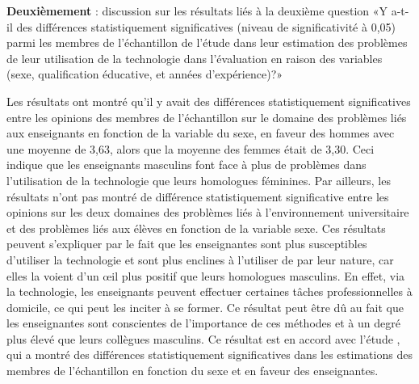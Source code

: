 \documentclass[french]{textolivre}
\begin{document}
\textbf{Deuxièmement} : discussion sur les résultats liés à la deuxième question «Y a-t-il des différences statistiquement significatives (niveau de significativité à 0,05) parmi les membres de l'échantillon de l'étude dans leur estimation des problèmes de leur utilisation de la technologie dans l'évaluation en raison des variables (sexe, qualification éducative, et années d'expérience)?»

Les résultats ont montré qu'il y avait des différences statistiquement significatives entre les opinions des membres de l'échantillon sur le domaine des problèmes liés aux enseignants en fonction de la variable du sexe, en faveur des hommes avec une moyenne de 3,63, alors que la moyenne des femmes était de 3,30. Ceci indique que les enseignants masculins font face à plus de problèmes dans l'utilisation de la technologie que leurs homologues féminines. Par ailleurs, les résultats n'ont pas montré de différence statistiquement significative entre les opinions sur les deux domaines des problèmes liés à l'environnement universitaire et des problèmes liés aux élèves en fonction de la variable sexe. Ces résultats peuvent s'expliquer par le fait que les enseignantes sont plus susceptibles d'utiliser la technologie et sont plus enclines à l'utiliser de par leur nature, car elles la voient d'un œil plus positif que leurs homologues masculins. En effet, via la technologie, les enseignants peuvent effectuer certaines tâches professionnelles à domicile, ce qui peut les inciter à se former. Ce résultat peut être dû au fait que les enseignantes sont conscientes de l'importance de ces méthodes et à un degré plus élevé que leurs collègues masculins. Ce résultat est en accord avec l'étude \textcite{alomari2011}, qui a montré des différences statistiquement significatives dans les estimations des membres de l'échantillon en fonction du sexe et en faveur des enseignantes.
\end{document}
